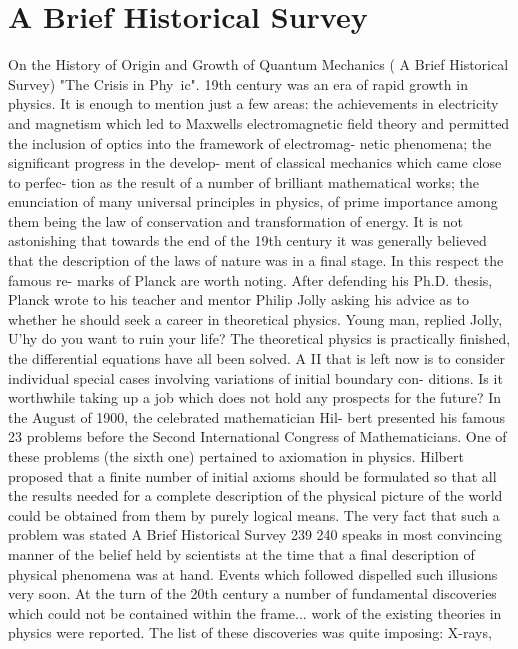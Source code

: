 \documentclass[a4paper,sfsidenotes,colorlinks=true]{tufte-book}
\numberwithin{equation}{section}
\numberwithin{figure}{section}
\begin{document}
{{{{{{\chapter{A Brief Historical Survey}
On the History of Origin and Growth of Quantum Mechanics ( A	Brief	Historical	Survey)
"The Crisis in Phy~ic". 19th century was an era of rapid growth in physics. It is enough to mention just a few areas: the achievements in electricity and magnetism which led to Maxwells electromagnetic field theory and permitted the inclusion of optics into the framework of electromag- netic phenomena; the significant progress in the develop- ment of classical mechanics which came close to perfec- tion as the result of a number of brilliant mathematical works; the enunciation of many universal principles in physics, of prime importance among them being the law of conservation and transformation of energy. It is not astonishing that towards the end of the 19th century it was generally believed that the description of the laws of nature was in a final stage. In this respect the famous re- marks of Planck are worth noting. After defending his Ph.D. thesis, Planck wrote to his teacher and mentor Philip Jolly asking his advice as to whether he should seek a career in theoretical physics. Young man, replied Jolly, U'hy do you want to ruin your life? The theoretical
physics is practically finished, the differential equations have all been solved. A II that is left now is to consider individual special cases involving variations of initial boundary con- ditions. Is it worthwhile taking up a job which does not hold any prospects for the future?
In the August of 1900, the celebrated mathematician Hil- bert presented his famous 23 problems before the Second International Congress of Mathematicians. One of these problems (the sixth one) pertained to axiomation in physics. Hilbert proposed that a finite number of initial axioms should be formulated so that all the results needed for a complete description of the physical picture of the world could be obtained from them by purely logical means. The very fact that such a problem was stated
A Brief Historical Survey
239
240
speaks in most convincing manner of the belief held by scientists at the time that a final description of physical phenomena was at hand. Events which followed dispelled such illusions very soon. At the turn of the 20th century a number of fundamental discoveries which could not be contained within the frame... work of the existing theories in physics were reported. The list of these discoveries was quite imposing: X-rays,
}}}}}}
\end{document}
